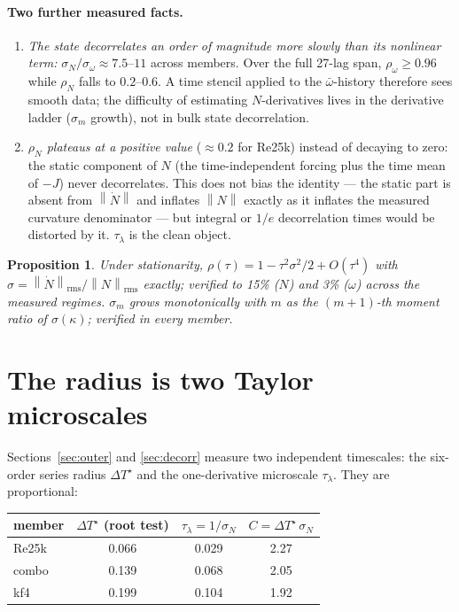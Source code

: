\documentclass[11pt]{article}
\newtheorem{proposition}{Proposition}
\theoremstyle{remark}
\newcommand{\wbar}{\bar{\omega}}
\newcommand{\DTs}{\Delta T^{\star}}
\newcommand{\taul}{\tau_{\lambda}}
\newcommand{\norm}[1]{\left\lVert #1 \right\rVert}
\begin{document}
\paragraph{Two further measured facts.}
\begin{enumerate}
\item \emph{The state decorrelates an order of magnitude more slowly than
its nonlinear term:} $\sigma_N/\sigma_\omega \approx 7.5$--$11$ across
members. Over the full 27-lag span, $\rho_\omega \ge 0.96$ while $\rho_N$
falls to $0.2$--$0.6$. A time stencil applied to the $\wbar$-history
therefore sees smooth data; the difficulty of estimating $N$-derivatives
lives in the derivative ladder ($\sigma_m$ growth), not in bulk state
decorrelation.
\item \emph{$\rho_N$ plateaus at a positive value} ($\approx 0.2$ for Re25k)
instead of decaying to zero: the static component of $N$ (the
time-independent forcing plus the time mean of $-J$) never decorrelates.
This does not bias the identity --- the static part is absent from
$\norm{\dot N}$ and inflates $\norm{N}$ exactly as it inflates the measured
curvature denominator --- but integral or $1/e$ decorrelation times would be
distorted by it. $\taul$ is the clean object.
\end{enumerate}

\begin{proposition}\label{prop:microscale}
Under stationarity, $\rho(\tau) = 1 - \tau^2\sigma^2/2 + O(\tau^4)$ with
$\sigma = \norm{\dot N}_{\mathrm{rms}}/\norm{N}_{\mathrm{rms}}$ exactly;
verified to 15\% ($N$) and 3\% ($\omega$) across the measured regimes.
$\sigma_m$ grows monotonically with $m$ as the $(m{+}1)$-th moment ratio of
$\sigma(\kappa)$; verified in every member.
\end{proposition}

\section{The radius is two Taylor microscales}\label{sec:radius-micro}

Sections~\ref{sec:outer} and \ref{sec:decorr} measure two independent
timescales: the six-order series radius $\DTs$ and the one-derivative
microscale $\taul$. They are proportional:

\begin{center}
\begin{tabular}{lccc}
\toprule
member & $\DTs$ (root test) & $\taul = 1/\sigma_N$ & $C = \DTs\,\sigma_N$\\
\midrule
Re25k & 0.066 & 0.029 & 2.27\\
combo & 0.139 & 0.068 & 2.05\\
kf4   & 0.199 & 0.104 & 1.92\\
\bottomrule
\end{tabular}
\end{center}
\end{document}
